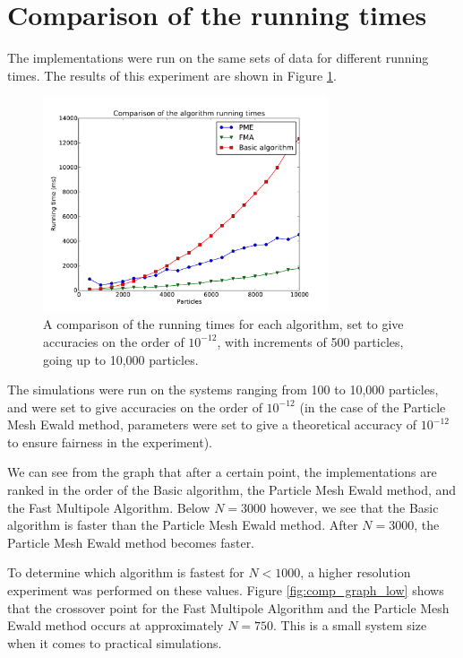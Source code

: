\documentclass[pdftex,twoside,a4paper]{report}
\newcommand{\bcen}{\begin{center}}
\newcommand{\ecen}{\end{center}}
\newcommand{\pmem}{Particle Mesh Ewald method}
\newcommand{\fma}{Fast Multipole Algorithm}
\begin{document}
\section{Comparison of the running times}
\label{sec:run_comp}
The implementations were run on the same sets of data for different running times. The results of this experiment are shown in Figure \ref{fig:comp_graph}.
\begin{figure}[H]
\bcen \includegraphics[width=0.75\textwidth]{figures/graphs/comp_graph.pdf} \ecen
\caption{A comparison of the running times for each algorithm, set to give accuracies on the order of $10^{-12}$, with increments of 500 particles, going up to 10,000 particles.}
\label{fig:comp_graph}
\end{figure}
The simulations were run on the systems ranging from 100 to 10,000 particles, and were set to give accuracies on the order of $10^{-12}$ (in the case of the \pmem, parameters were set to give a theoretical accuracy of $10^{-12}$ to ensure fairness in the experiment).

We can see from the graph that after a certain point, the implementations are ranked in the order of the Basic algorithm, the \pmem{}, and the \fma{}. Below $N=3000$ however, we see that the Basic algorithm is faster than the \pmem{}. After $N=3000$, the \pmem{} becomes faster.

To determine which algorithm is fastest for $N < 1000$, a higher resolution experiment was performed on these values. Figure \ref{fig:comp_graph_low} shows that the crossover point for the \fma{} and the \pmem{} occurs at approximately $N=750$. This is a small system size when it comes to practical simulations.
\end{document}
